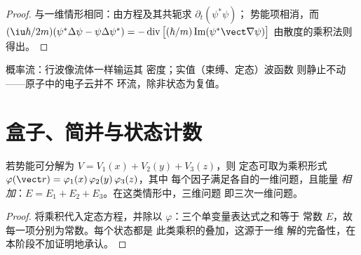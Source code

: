 \begin{proof}
与一维情形相同：由方程及其共轭求 $\partial_t(\psi^*\psi)$；
势能项相消，而 $(\iu\hbar/2m)
(\psi^*\Delta\psi - \psi\Delta\psi^*) =
-\operatorname{div}\big[(\hbar/m)\operatorname{Im}(\psi^*\vect\nabla
\psi)\big]$ 由散度的乘积法则得出。
\end{proof}

\begin{omfigure}

{\small 概率流：行波像流体一样输运其
密度；实值（束缚、定态）波函数
则静止不动——原子中的电子云并不
环流，除非状态为复值。}
\end{omfigure}

\section{盒子、简并与状态计数}

\begin{theorem}[分离变量法]\label{thm:b3:schrodinger-three-dimensions:separation}
若势能可分解为 $V = V_1(x) + V_2(y) + V_3(z)$，则
定态可取为乘积形式
$\varphi(\vect r) = \varphi_1(x)\,\varphi_2(y)\,\varphi_3(z)$，其中
每个因子满足各自的一维问题，且能量
\emph{相加}：$E = E_1 + E_2 + E_3$。在这类情形中，三维问题
即三次一维问题。
\end{theorem}

\begin{proof}
将乘积代入定态方程，并除以
$\varphi$：三个单变量表达式之和等于
常数 $E$，故每一项分别为常数。每个状态都是
此类乘积的叠加，这源于一维
解的完备性，在本阶段不加证明地承认。
\end{proof}

